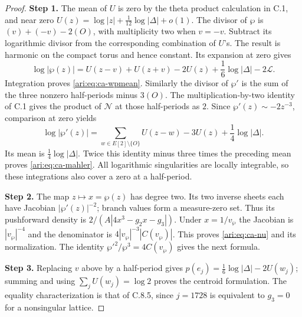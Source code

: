 \documentclass[11pt,a4paper]{article}
\theoremstyle{plain}
\theoremstyle{definition}
\begin{document}
\begin{proof}
\noindent\textbf{Step 1.} The mean of $U$ is zero by the theta product calculation in C.1,
and near zero
$U(z)=\log|z|+\frac1{12}\log|\Delta|+o(1)$.
The divisor of $\wp$ is $(v)+(-v)-2(O)$, with multiplicity
two when $v=-v$. Subtract its logarithmic divisor from the
corresponding combination of $U$'s. The result is harmonic
on the compact torus and hence constant. Its expansion at
zero gives
\[
 \log|\wp(z)|=U(z-v)+U(z+v)-2U(z)
                  +\frac16\log|\Delta|-2\mathcal L.
\]
Integration proves \eqref{ari:eq:ca-wpmean}.
Similarly the divisor of $\wp'$ is the sum of the three
nonzero half-periods minus $3(O)$. The multiplication-by-two
identity of C.1 gives the product of $\mathcal N$ at those half-periods
as $2$. Since $\wp'(z)\sim-2z^{-3}$, comparison at zero yields
\[
 \log|\wp'(z)|=\sum_{w\in E[2]\setminus\{O\}}U(z-w)-3U(z)
                         +\frac14\log|\Delta|.
\]
Its mean is $\frac14\log|\Delta|$. Twice this identity minus
three times the preceding mean proves \eqref{ari:eq:ca-mahler}.
All logarithmic singularities are locally integrable, so these
integrations also cover a zero at a half-period.


\noindent\textbf{Step 2.} The map $z\mapsto x=\wp(z)$ has degree two. Its two inverse
sheets each have Jacobian $|\wp'(z)|^{-2}$; branch values form
a measure-zero set. Thus its pushforward density is
$2/(A|4x^3-g_2x-g_3|)$. Under $x=1/v_{\wp}$ the Jacobian is
$|v_{\wp}|^{-4}$ and the denominator is $4|v_{\wp}|^{-3}|C(v_{\wp})|$.
This proves \eqref{ari:eq:ca-nu} and its normalization. The identity
$\wp'^2/\wp^3=4C(v_{\wp})$ gives the next formula.


\noindent\textbf{Step 3.} Replacing $v$ above by a half-period gives
$p(e_j)=\frac16\log|\Delta|-2U(w_j)$; summing and using
$\sum_jU(w_j)=\log2$ proves the centroid formulation.
The equality characterization is that of C.8.5,
since $j=1728$ is equivalent to $g_3=0$ for a nonsingular lattice.
\end{proof}
\end{document}
